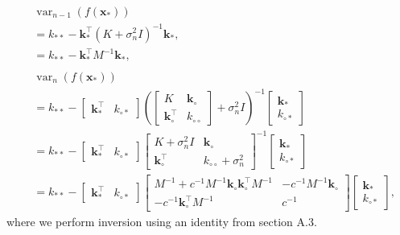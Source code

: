 \documentclass{article}
\DeclareMathOperator{\var}{var}
\newcommand{\bfk}{\mathbf{k}}
\newcommand{\bfx}{\mathbf{x}}
\begin{document}
  \begin{align*}
    &\var_{n-1}(f(\bfx_*)) \\
    &= k_{**} - \bfk_*^\top
    \left(K + \sigma^2_n I \right)^{-1} \bfk_* \text{,} \\
    &= k_{**} - \bfk_*^\top M^{-1} \bfk_* \text{,} \\
    \\
    &\var_n(f(\bfx_*)) \\
    &= k_{**} - \begin{bmatrix} \bfk_*^\top & k_{\circ*} \end{bmatrix}
    \left(\begin{bmatrix}
    K & \bfk_\circ \\ \bfk_\circ^\top & k_{\circ\circ}
    \end{bmatrix} + \sigma^2_n I \right)^{-1}
    \begin{bmatrix} \bfk_* \\ k_{\circ*} \end{bmatrix} \\
    &= k_{**} - \begin{bmatrix} \bfk_*^\top & k_{\circ*} \end{bmatrix}
    \begin{bmatrix}
    K + \sigma^2_n I & \bfk_\circ \\
    \bfk_\circ^\top & k_{\circ\circ} + \sigma^2_n
    \end{bmatrix}^{-1}
    \begin{bmatrix} \bfk_* \\ k_{\circ*} \end{bmatrix} \\
    &= k_{**} - \begin{bmatrix} \bfk_*^\top & k_{\circ*} \end{bmatrix}
    \begin{bmatrix}
    M^{-1}+ c^{-1}M^{-1}\bfk_\circ\bfk_\circ^\top M^{-1} &
    -c^{-1}M^{-1} \bfk_\circ \\
    -c^{-1}\bfk_\circ^\top M^{-1} &
    c^{-1}
    \end{bmatrix}
    \begin{bmatrix} \bfk_* \\ k_{\circ*} \end{bmatrix} \text{,}
  \end{align*} where we perform inversion using an identity from section A.3.
\end{document}
